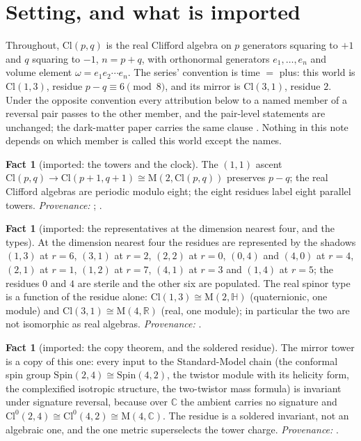 \documentclass[11pt]{article}
\theoremstyle{definition}
\newtheorem{fact}[theorem]{Fact}
\newcommand{\Cl}{\mathrm{Cl}}
\newcommand{\R}{\mathbb{R}}
\newcommand{\C}{\mathbb{C}}
\newcommand{\HH}{\mathbb{H}}
\newcommand{\Mat}{\mathrm{M}}
\begin{document}
\newpage
\section{Setting, and what is imported}\label{sec:setting}

Throughout, $\Cl(p,q)$ is the real Clifford algebra on $p$ generators squaring to $+1$ and $q$ squaring to $-1$, $n = p + q$, with orthonormal generators $e_{1}, \ldots, e_{n}$ and volume element $\omega = e_{1}e_{2}\cdots e_{n}$. The series' convention is time $= $ plus: this world is $\Cl(1,3)$, residue $p - q \equiv 6 \pmod 8$, and its mirror is $\Cl(3,1)$, residue $2$. Under the opposite convention every attribution below to a named member of a reversal pair passes to the other member, and the pair-level statements are unchanged; the dark-matter paper carries the same clause \cite[Thm.~3.4]{ButlerT14}. Nothing in this note depends on which member is called this world except the names.

\begin{fact}[imported: the towers and the clock]\label{fact:towers}
The $(1,1)$ ascent $\Cl(p,q) \to \Cl(p+1,q+1) \cong \Mat(2, \Cl(p,q))$ preserves $p - q$; the real Clifford algebras are periodic modulo eight; the eight residues label eight parallel towers. \emph{Provenance:} \cite[Thms.~3.2 and 3.6]{ButlerT3}; \cite[Fact~2.5]{ButlerT14}.
\end{fact}

\begin{fact}[imported: the representatives at the dimension nearest four, and the types]\label{fact:reps}
At the dimension nearest four the residues are represented by the shadows $(1,3)$ at $r = 6$, $(3,1)$ at $r = 2$, $(2,2)$ at $r = 0$, $(0,4)$ and $(4,0)$ at $r = 4$, $(2,1)$ at $r = 1$, $(1,2)$ at $r = 7$, $(4,1)$ at $r = 3$ and $(1,4)$ at $r = 5$; the residues $0$ and $4$ are sterile and the other six are populated. The real spinor type is a function of the residue alone: $\Cl(1,3) \cong \Mat(2,\HH)$ (quaternionic, one module) and $\Cl(3,1) \cong \Mat(4,\R)$ (real, one module); in particular the two are not isomorphic as real algebras. \emph{Provenance:} \cite[Prop.~3.1, Thm.~3.4]{ButlerT14}.
\end{fact}

\begin{fact}[imported: the copy theorem, and the soldered residue]\label{fact:copy}
The mirror tower is a copy of this one: every input to the Standard-Model chain (the conformal spin group $\mathrm{Spin}(2,4) \cong \mathrm{Spin}(4,2)$, the twistor module with its helicity form, the complexified isotropic structure, the two-twistor mass formula) is invariant under signature reversal, because over $\C$ the ambient carries no signature and $\Cl^{0}(2,4) \cong \Cl^{0}(4,2) \cong \Mat(4,\C)$. The residue is a soldered invariant, not an algebraic one, and the one metric superselects the tower charge. \emph{Provenance:} \cite[Thms.~3.5 and 4.3, Prop.~4.1]{ButlerT14}.
\end{fact}
\end{document}
